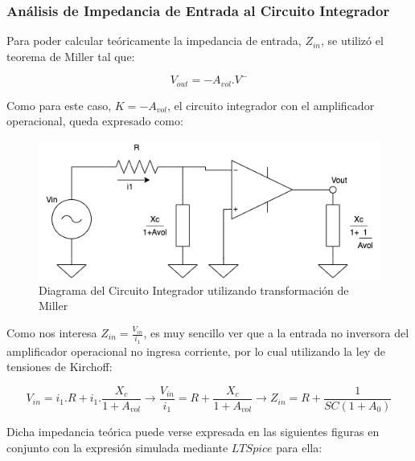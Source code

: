 \subsubsection{Análisis de Impedancia de Entrada al Circuito Integrador}

Para poder calcular teóricamente la impedancia de entrada, $Z_{in}$, se utilizó el teorema de Miller tal que:

$$ V_{out}=-A_{vol}.V^-$$

Como para este caso, $K=-A_{vol}$, el circuito integrador con el amplificador operacional, queda expresado como:

\begin{figure}[H]
    \centering 
    \includegraphics [scale=0.6] {../Ejercicio3-CircuitoIntegradoresyDerivadores/Imagenes/miller-integrador.png} 
    \caption{Diagrama del Circuito Integrador utilizando transformación de Miller }
    \label{fig:emptyPlotTool}
\end{figure}

Como nos interesa $Z_{in}=\frac{V_{in}}{i_1}$, es muy sencillo ver que a la entrada no inversora del amplificador operacional no ingresa corriente,
por lo cual utilizando la ley de tensiones de Kirchoff:

$$ V_{in} = i_1.R + i_1.\frac{X_c}{1+A_{vol}} \longrightarrow \frac{V_{in}}{i_1}= R + \frac{X_c}{1+A_{vol}} \longrightarrow Z_{in}=R+\frac{1}{SC(1+A_0)}$$

Dicha impedancia teórica puede verse expresada en las siguientes figuras en conjunto con la expresión simulada mediante $LTSpice$ para ella:

